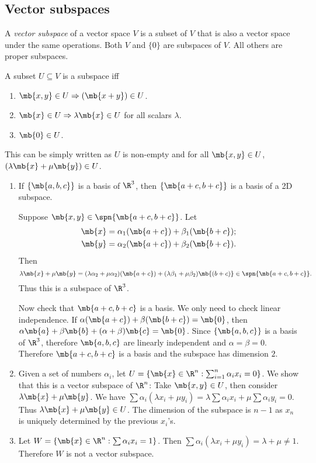 \documentclass[a4paper]{article}
\begin{document}
\subsection{Vector subspaces}
\begin{defi}
  A \emph{vector subspace} of a vector space $V$ is a subset of $V$ that is also a vector space under the same operations. Both $V$ and $\{0\}$ are subspaces of $V$. All others are proper subspaces.

A subset $U\subseteq V$ is a subspace iff
\begin{enumerate}
\item $\mb{x, y}\in U \Rightarrow (\mb{x + y}) \in U$.
\item $\mb{x}\in U \Rightarrow \lambda\mb{x} \in U$ for all scalars $\lambda$.
\item $\mb{0}\in U$.
\end{enumerate}
This can be simply written as $U$ is non-empty and  for all $\mb{x, y}\in U$, $(\lambda\mb{x} + \mu\mb{y})\in U$.
\end{defi}

\begin{eg}\leavevmode
  \begin{enumerate}
  \item If $\{\mb{a, b, c}\}$ is a basis of $\R^3$, then $\{\mb{a + c, b + c}\}$ is a basis of a 2D subspace.

  Suppose $\mb{x, y}\in \spn\{\mb{a + c, b + c}\}$. Let
  \begin{align*}
    \mb{x} &= \alpha_1(\mb{a + c}) + \beta_1(\mb{b + c});\\
    \mb{y} &= \alpha_2(\mb{a + c}) + \beta_2(\mb{b + c}).
  \end{align*}
  Then
  \[
  \lambda\mb{x} + \mu\mb{y} = (\lambda\alpha_2+\mu\alpha_2)(\mb{a + c}) + (\lambda\beta_1 + \mu\beta_2)\mb{(b + c)}\in\spn\{\mb{a + c, b + c}\}.
  \]
  Thus this is a subspace of $\R^3$.

  Now check that $\mb{a + c, b + c}$ is a basis. We only need to check linear independence. If $\alpha(\mb{a + c}) + \beta(\mb{b + c}) = \mb{0}$, then $\alpha\mb{a} + \beta\mb{b} + (\alpha + \beta)\mb{c} = \mb{0}$. Since $\{\mb{a, b, c}\}$ is a basis of $\R^3$, therefore $\mb{a, b, c}$ are linearly independent and $\alpha = \beta = 0$. Therefore $\mb{a + c, b + c}$ is a basis and the subspace has dimension $2$.
  \item Given a set of numbers $\alpha_i$, let $U = \{\mb{x}\in \R^n: \sum_{i=1}^n \alpha_ix_i = 0\}$. We show that this is a vector subspace of $\R^n$: Take $\mb{x, y}\in U$, then consider $\lambda\mb{x} + \mu\mb{y}$. We have $\sum\alpha_i(\lambda x_i + \mu y_i) = \lambda\sum\alpha_ix_i + \mu\sum\alpha_iy_i = 0$. Thus $\lambda\mb{x} + \mu\mb{y} \in U$. The dimension of the subspace is $n-1$ as $x_n$ is uniquely determined by the previous $x_i$'s.
  \item Let $W = \{\mb{x}\in \R^n: \sum \alpha_ix_i = 1\}$. Then $\sum\alpha_i(\lambda x_i + \mu y_i) = \lambda + \mu \not= 1$. Therefore $W$ is not a vector subspace.
  \end{enumerate}
\end{eg}
\end{document}
